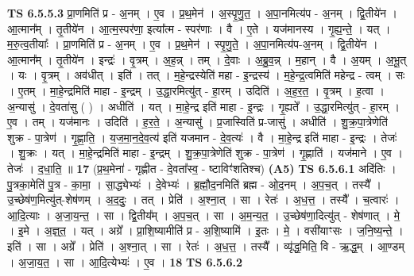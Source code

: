 \documentclass[17pt]{extarticle}
\begin{document}
                  \newline
                                \textbf{ TS 6.5.5.3} \newline
                  प्रा॒णमिति॑ प्र - अ॒नम् । ए॒व । प्र॒थ॒मेन॑ । अ॒स्पृ॒णु॒त॒ । अ॒पा॒नमित्य॑प - अ॒नम् । द्वि॒तीये॑न । आ॒त्मान᳚म् । तृ॒तीये॑न । आ॒त्म॒स्पर॑णा॒ इत्या᳚त्म - स्पर॑णाः । वै । ए॒ते । यज॑मानस्य । गृ॒ह्य॒न्ते॒ । यत् । म॒रु॒त्व॒तीयाः᳚ । प्रा॒णमिति॑ प्र - अ॒नम् । ए॒व । प्र॒थ॒मेन॑ । स्पृ॒णु॒ते॒ । अ॒पा॒नमित्य॑प-अ॒नम् । द्वि॒तीये॑न । आ॒त्मान᳚म् । तृ॒तीये॑न । इन्द्रः॑ । वृ॒त्रम् । अ॒ह॒न्न् । तम् । दे॒वाः । अ॒ब्रु॒व॒न्न् । म॒हान् । वै । अ॒यम् । अ॒भू॒त् । यः । वृ॒त्रम् । अव॑धीत् । इति॑ । तत् । म॒हे॒न्द्रस्येति॑ महा - इ॒न्द्रस्य॑ । म॒हे॒न्द्र॒त्वमिति॑ महेन्द्र - त्वम् । सः । ए॒तम् । मा॒हे॒न्द्रमिति॑ माहा - इ॒न्द्रम् । उ॒द्धा॒रमित्यु॑त् - हा॒रम् । उदिति॑ । अ॒ह॒र॒त॒ । वृ॒त्रम् । ह॒त्वा । अ॒न्यासु॑ । दे॒वता॑सु ( ) । अधीति॑ । यत् । मा॒हे॒न्द्र इति॑ माहा - इ॒न्द्रः । गृ॒ह्यते᳚ । उ॒द्धा॒रमित्यु॑त् - हा॒रम् । ए॒व । तम् । यज॑मानः । उदिति॑ । ह॒र॒ते॒ । अ॒न्यासु॑ । प्र॒जास्विति॑ प्र-जासु॑ । अधीति॑ । शु॒क्र॒पा॒त्रेणेति॑ शुक्र - पा॒त्रेण॑ । गृ॒ह्णा॒ति॒ । य॒ज॒मा॒न॒दे॒व॒त्य॑ इति॑ यजमान - दे॒व॒त्यः॑ । वै । मा॒हे॒न्द्र इति॑ माहा - इ॒न्द्रः । तेजः॑ । शु॒क्रः । यत् । मा॒हे॒न्द्रमिति॑ माहा - इ॒न्द्रम् । शु॒क्र॒पा॒त्रेणेति॑ शुक्र - पा॒त्रेण॑ । गृ॒ह्णाति॑ । यज॑माने । ए॒व । तेजः॑ । द॒धा॒ति॒ ॥ \textbf{  17} \newline
                  \newline
                      (प्र॒थ॒मेना॑ - गृह्णीत - दे॒वता᳚स्व॒ - ष्टाविꣳ॑शतिश्च)  \textbf{(A5)} \newline \newline
                                \textbf{ TS 6.5.6.1} \newline
                  अदि॑तिः । पु॒त्रका॒मेति॑ पु॒त्र - का॒मा॒ । सा॒द्ध्येभ्यः॑ । दे॒वेभ्यः॑ । ब्र॒ह्मौ॒द॒नमिति॑ ब्रह्म - ओ॒द॒नम् । अ॒प॒च॒त् । तस्यै᳚ । उ॒च्छेष॑ण॒मित्यु॑त्-शेष॑णम् । अ॒द॒दुः॒ । तत् । प्रेति॑ । अ॒श्ना॒त् । सा । रेतः॑ । अ॒ध॒त्त॒ । तस्यै᳚ । च॒त्वारः॑ । आ॒दि॒त्याः । अ॒जा॒य॒न्त॒ । सा । द्वि॒तीय᳚म् । अ॒प॒च॒त् । सा । अ॒म॒न्य॒त॒ । उ॒च्छेष॑णा॒दित्यु॑त् - शेष॑णात् । मे॒ । इ॒मे । अ॒ज्ञ्॒त॒ । यत् । अग्रे᳚ । प्रा॒शि॒ष्यामीति॑ प्र - अ॒शि॒ष्यामि॑ । इ॒तः । मे॒ । वसी॑याꣳसः । ज॒नि॒ष्य॒न्ते॒ । इति॑ । सा । अग्रे᳚ । प्रेति॑ । अ॒श्ना॒त् । सा । रेतः॑ । अ॒ध॒त्त॒ । तस्यै᳚ । व्यृ॑द्ध॒मिति॒ वि - ऋ॒द्ध॒म् । आ॒ण्डम् । अ॒जा॒य॒त॒ । सा । आ॒दि॒त्येभ्यः॑ । ए॒व । \textbf{  18} \newline
                  \newline
                                \textbf{ TS 6.5.6.2} \newline
\end{document}
